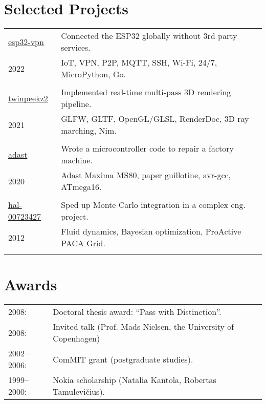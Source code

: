 \documentclass[a4paper,11pt]{article}
\begin{document}
\section*{Selected Projects}
\label{sect:pubs}

\begin{tabular}{ll}
\href{https://github.com/aabbtree77/esp32-vpn}{esp32-vpn} & Connected the ESP32 globally without 3rd party services.\\
               2022    & IoT, VPN, P2P, MQTT, SSH, Wi-Fi, 24/7, MicroPython, Go.\\
                       &\\
\href{https://github.com/aabbtree77/twinpeekz2}{twinpeekz2}    & Implemented real-time multi-pass 3D rendering pipeline.\\
                   2021       & GLFW, GLTF, OpenGL/GLSL, RenderDoc, 3D ray marching, Nim.\\
                          &\\
\href{https://github.com/aabbtree77/adast}{adast} & Wrote a microcontroller code to repair a factory machine. \\
2020 & Adast Maxima MS80, paper guillotine, avr-gcc, ATmega16. \\
     &\\                        
\href{https://hal.archives-ouvertes.fr/hal-00723427}{hal-00723427} & Sped up Monte Carlo integration in a complex eng. project.\\
                     2012 & Fluid dynamics, Bayesian optimization, ProActive PACA Grid.\\
                          &  \\        
\end{tabular}

%


%
%
\section*{Awards}
%
\begin{tabular}{ll}
        2008: & Doctoral thesis award: “Pass with Distinction”.\\
        2008: & Invited talk (Prof. Mads Nielsen, the University of Copenhagen)\\
        2002--2006:& ComMIT grant (postgraduate studies).\\
        1999--2000:& Nokia scholarship (Natalia Kantola, Robertas Tamulevi\v{c}ius).
\end{tabular}
%
%

\end{document}
